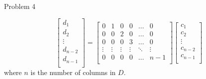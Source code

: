 \begin{problem}{Problem 4}
\begin{Highlight}[Solution]
        \begin{equation}
            \begin{bmatrix}
                d_{1} \\
                d_{2} \\
                \vdots \\
                d_{n - 2} \\
                d_{n - 1} \\
            \end{bmatrix}
            = 
            \begin{bmatrix}
                0 & 1 & 0 & 0 & \dots & 0 \\
                0 & 0 & 2 & 0 & \dots & 0 \\
                0 & 0 & 0 & 3 & \dots & 0 \\
                \vdots & \vdots & \vdots & \vdots & \ddots & \vdots \\
                0 & 0 & 0 & 0 & \dots & n - 1 \\
            \end{bmatrix}
            \begin{bmatrix}
                c_{1} \\
                c_{2} \\
                \vdots \\
                c_{n - 2} \\
                c_{n - 1} \\
            \end{bmatrix}
        \end{equation}
        where $n$ is the number of columns in $D$.
    \end{Highlight}
\end{problem}

